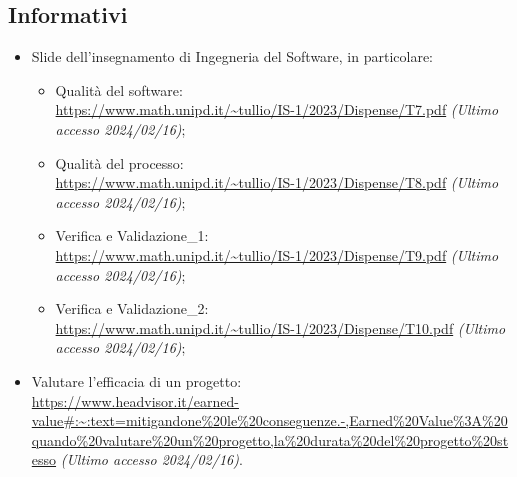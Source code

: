\subsection{Informativi}
\begin{itemize}
    \item Slide dell’insegnamento di Ingegneria del Software, in particolare:
        \begin{itemize}
            \item Qualità del software: \\ \url{https://www.math.unipd.it/~tullio/IS-1/2023/Dispense/T7.pdf} \textit{(Ultimo accesso 2024/02/16)};
            \item Qualità del processo:\\ \url{https://www.math.unipd.it/~tullio/IS-1/2023/Dispense/T8.pdf} \textit{(Ultimo accesso 2024/02/16)};
            \item Verifica e Validazione\_1:\\ \url{https://www.math.unipd.it/~tullio/IS-1/2023/Dispense/T9.pdf} \textit{(Ultimo accesso 2024/02/16)};
            \item Verifica e Validazione\_2:\\ \url{https://www.math.unipd.it/~tullio/IS-1/2023/Dispense/T10.pdf} \textit{(Ultimo accesso 2024/02/16)};
        \end{itemize}
    \item Valutare l'efficacia di un progetto: \\ \url{https://www.headvisor.it/earned-value#:~:text=mitigandone%20le%20conseguenze.-,Earned%20Value%3A%20quando%20valutare%20un%20progetto,la%20durata%20del%20progetto%20stesso} \textit{(Ultimo accesso 2024/02/16)}.
\end{itemize}
